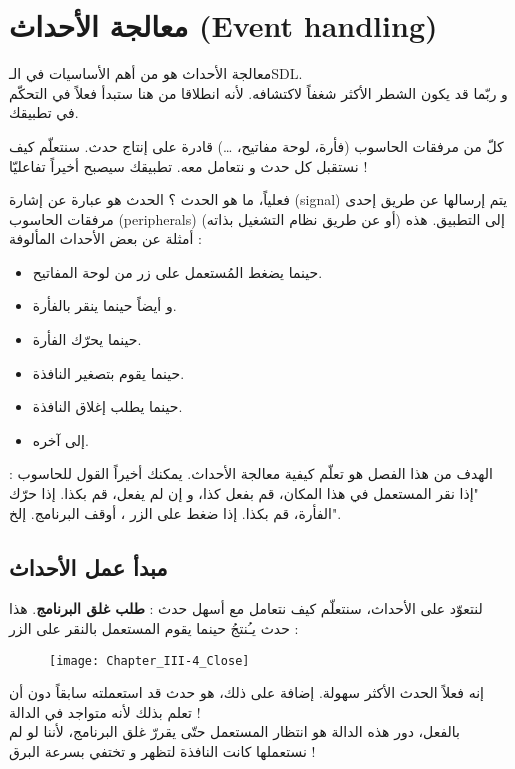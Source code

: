 \chapter{معالجة الأحداث (\textenglish{Event handling})}

معالجة الأحداث هو من أهم الأساسيات في الـ\textenglish{SDL}.\\
و ربّما قد يكون الشطر الأكثر شغفاً لاكتشافه. لأنه انطلاقا من هنا ستبدأ فعلاً في التحكّم في تطبيقك.

كلّ من مرفقات الحاسوب (فأرة، لوحة مفاتيح، \dots) قادرة على إنتاج حدث. سنتعلّم كيف نستقبل كل حدث و نتعامل معه. تطبيقك سيصبح أخيراً تفاعليّا !

فعلياً، ما هو الحدث ؟ الحدث هو عبارة عن إشارة
(\textenglish{signal})
يتم إرسالها عن طريق إحدى مرفقات الحاسوب 
(\textenglish{peripherals})
(أو عن طريق نظام التشغيل بذاته) إلى التطبيق. هذه أمثلة عن بعض الأحداث المألوفة :

\begin{itemize}
	\item حينما يضغط المُستعمل على زر من لوحة المفاتيح.
	\item و أيضاً حينما ينقر بالفأرة.
	\item حينما يحرّك الفأرة.
	\item حينما يقوم بتصغير النافذة.
	\item حينما يطلب إغلاق النافذة.
	\item إلى آخره.
\end{itemize}

الهدف من هذا الفصل هو تعلّم كيفية معالجة الأحداث. يمكنك أخيراً القول للحاسوب : "إذا نقر المستعمل في هذا المكان، قم بفعل كذا، و إن لم يفعل، قم بكذا. إذا حرّك الفأرة، قم بكذا. إذا ضغط على الزر
،
أوقف البرنامج. إلخ".

\section{مبدأ عمل الأحداث}

لنتعوّد على الأحداث، سنتعلّم كيف نتعامل مع أسهل حدث :
\textbf{طلب غلق البرنامج}.
هذا حدث يـُنتجُ حينما يقوم المستعمل بالنقر على الزر
 :

\begin{figure}[H]
	\centering
	\texttt{[image: Chapter\_III-4\_Close]}
\end{figure}

إنه فعلاً الحدث الأكثر سهولة. إضافة على ذلك، هو حدث قد استعملته سابقاً دون أن تعلم بذلك لأنه متواجد في الدالة 
 !\\
بالفعل، دور هذه الدالة هو انتظار المستعمل حتّى يقررّ غلق البرنامج، لأننا لو لم نستعملها كانت النافذة لتظهر و تختفي بسرعة البرق !


